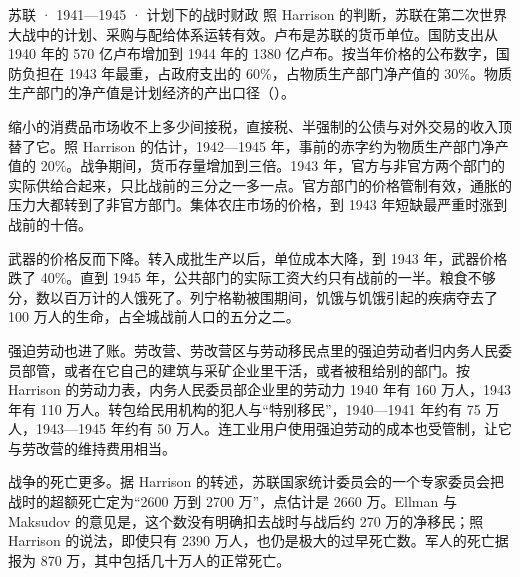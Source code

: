 \begin{case}{苏联 · 1941—1945 · 计划下的战时财政}
照 Harrison 的判断，苏联在第二次世界大战中的计划、采购与配给体系运转有效\cite{harrison1998b}。卢布是苏联的货币单位。国防支出从 1940 年的 570 亿卢布增加到 1944 年的 1380 亿卢布\cite{harrison1998b}。按当年价格的公布数字，国防负担在 1943 年最重，占政府支出的 60\%，占物质生产部门净产值的 30\%\cite{harrison1998b}。物质生产部门的净产值是计划经济的产出口径（）。

缩小的消费品市场收不上多少间接税，直接税、半强制的公债与对外交易的收入顶替了它\cite{harrison1998b}。照 Harrison 的估计，1942—1945 年，事前的赤字约为物质生产部门净产值的 20\%\cite{harrison1998b}。战争期间，货币存量增加到三倍\cite{harrison1998b}。1943 年，官方与非官方两个部门的实际供给合起来，只比战前的三分之一多一点\cite{harrison1998b}。官方部门的价格管制有效，通胀的压力大都转到了非官方部门\cite{harrison1998b}。集体农庄市场的价格，到 1943 年短缺最严重时涨到战前的十倍\cite{harrison1998b}。

武器的价格反而下降。转入成批生产以后，单位成本大降，到 1943 年，武器价格跌了 40\%\cite{harrison1998b}。直到 1945 年，公共部门的实际工资大约只有战前的一半\cite{harrison1998b}。粮食不够分，数以百万计的人饿死了\cite{harrison1998b}。列宁格勒被围期间，饥饿与饥饿引起的疾病夺去了 100 万人的生命，占全城战前人口的五分之二\cite{harrison1998b}。

强迫劳动也进了账。劳改营、劳改营区与劳动移民点里的强迫劳动者归内务人民委员部管，或者在它自己的建筑与采矿企业里干活，或者被租给别的部门\cite{harrison1998b}。按 Harrison 的劳动力表，内务人民委员部企业里的劳动力 1940 年有 160 万人，1943 年有 110 万人\cite{harrison1998b}。转包给民用机构的犯人与“特别移民”，1940—1941 年约有 75 万人，1943—1945 年约有 50 万人\cite{harrison1998b}。连工业用户使用强迫劳动的成本也受管制，让它与劳改营的维持费用相当\cite{harrison1998b}。

战争的死亡更多。据 Harrison 的转述，苏联国家统计委员会的一个专家委员会把战时的超额死亡定为“2600 万到 2700 万”，点估计是 2660 万\cite{harrison1998b}。Ellman 与 Maksudov 的意见是，这个数没有明确扣去战时与战后约 270 万的净移民；照 Harrison 的说法，即使只有 2390 万人，也仍是极大的过早死亡数\cite{harrison1998b}。军人的死亡据报为 870 万，其中包括几十万人的正常死亡\cite{harrison1998b}。
\end{case}

